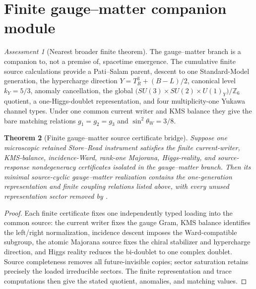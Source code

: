 \documentclass[11pt]{article}
\newtheorem{theorem}{Theorem}[section]
\theoremstyle{definition}
\theoremstyle{remark}
\newtheorem{assessment}[theorem]{Assessment}
\newcommand{\Z}{\mathbb Z}
\begin{document}
\section{Finite gauge--matter companion module}
\label{sec:gauge-matter-companion}

\begin{assessment}[Nearest broader finite theorem]
The gauge--matter branch is a companion to, not a premise of, spacetime
emergence.  The cumulative finite source calculations provide a Pati--Salam
parent, descent to one Standard-Model generation, the hypercharge direction
$Y=T_R^3+(B-L)/2$, canonical level $k_Y=5/3$, anomaly cancellation, the
global $\bigl(SU(3)\times SU(2)\times U(1)_Y\bigr)/\Z_6$ quotient, a
one-Higgs-doublet representation, and four multiplicity-one Yukawa channel
types.  Under one common current writer and KMS balance they give the bare
matching relations $g_1=g_2=g_3$ and $\sin^2\theta_W=3/8$.
\end{assessment}

\begin{theorem}[Finite gauge--matter source certificate bridge]
\label{thm:finite-SM-bridge}
Suppose one microscopic retained Store--Read instrument satisfies the finite
current-writer, KMS-balance, incidence-Ward, rank-one Majorana, Higgs-reality,
and source-response nondegeneracy certificates isolated in the gauge--matter
branch.  Then its minimal source-cyclic gauge--matter realization contains the
one-generation representation and finite coupling relations listed above,
with every unused representation sector removed by
.
\end{theorem}

\begin{proof}
Each finite certificate fixes one independently typed loading into the common
source: the current writer fixes the gauge Gram, KMS balance identifies the
left/right normalization, incidence descent imposes the Ward-compatible
subgroup, the atomic Majorana source fixes the chiral stabilizer and
hypercharge direction, and Higgs reality reduces the bi-doublet to one
complex doublet.  Source completeness removes all future-invisible copies;
sector saturation retains precisely the loaded irreducible sectors.  The
finite representation and trace computations then give the stated quotient,
anomalies, and matching values.
\end{proof}
\end{document}
